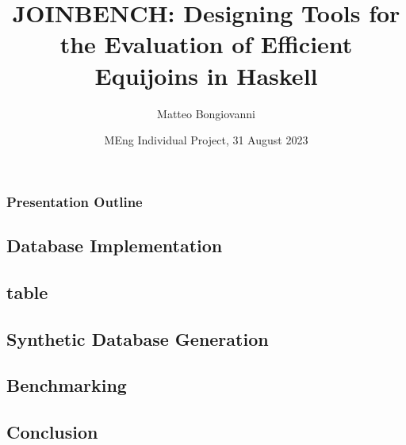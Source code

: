 \documentclass{beamer}
\title[JOINBENCH]{JOINBENCH: Designing Tools for the Evaluation of Efficient Equijoins in Haskell}
\author{Matteo Bongiovanni}
\date{MEng Individual Project, 31 August 2023}
\institute{Joint Mathematics and Computing \\ Department of Computing}
\begin{document}
\frame{\titlepage}

\begin{frame}
\frametitle{Presentation Outline}
\tableofcontents
\end{frame}

\begin{frame}
\section{Database Implementation}
\end{frame}

\begin{frame}
\section{ table}
\end{frame}

\begin{frame}
\section{Synthetic Database Generation}
\end{frame}

\begin{frame}
\section{Benchmarking}
\end{frame}

\begin{frame}
\section{Conclusion}
\end{frame}
\end{document}
